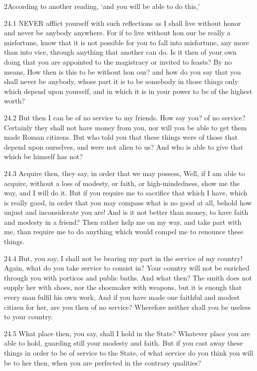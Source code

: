    2According to another reading, ‘and you will be able to do this,’

   24.1   NEVER afflict yourself with such reflections as I shall live without honor and never be anybody  anywhere. For if to live without hon our be really a misfortune, know that it is not possible for you to fall into misfortune, any more than into vice, through anything that another can do. Is it then of your own doing that you are appointed to the magistracy or invited to feasts? By no means, How then is this to be without hon our? and how do you say that you shall never be anybody, whose part it is to be somebody in those things only which depend upon yourself, and in which it is in your power to be of the highest worth?

   24.2    But then I can be of no service to my friends. How say you? of no service? Certainly they shall not have money from you, nor will you be able to get them made Roman citizens. But who told you that these things were of those that depend upon ourselves, and were not alien to us? And who is able to give that which be himself has not?

   24.3   Acquire then, they say, in order that we may possess, Well, if I am able to acquire, without a loss of modesty, or faith, or high-mindedness, show me the way, and I will do it. But if you require me to sacrifice that which I have, which is really good, in order that you may compass what is no good at all, behold how unjust and inconsiderate you are! And is it not better than money, to have faith and modesty in a friend? Then rather help me on my way, and take part with me, than require me to do anything which would compel me to renounce these things.

   24.4   But, you say, I shall not be bearing my part in the service of my country!  Again, what do you take service to consist in? Your country will not be enriched through you with porticos and public baths. And what then? The smith does not supply her with shoes, nor the shoemaker with weapons, but it is enough that every man fulfil his own work, And if you have made one faithful and modest citizen for her, are you then of no service? Wherefore neither shall you be useless to your country.

   24.5   What place then, you say, shall I hold in the State? Whatever place you are able to hold, guarding still your modesty and faith. But if you cast away these things in order to be of service to the State, of what service do you think you will be to her then, when you are perfected in the contrary qualities?

